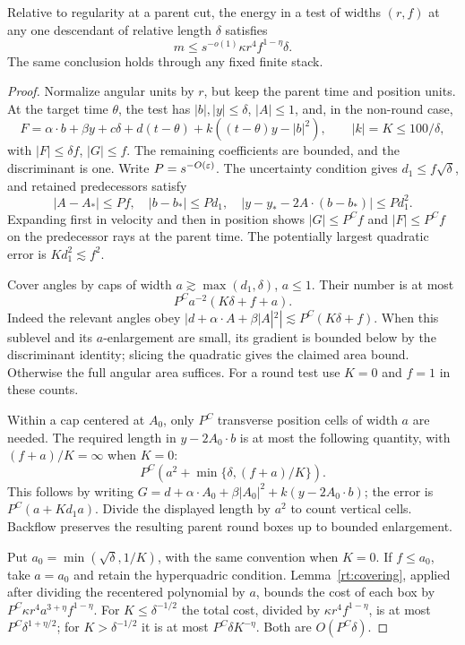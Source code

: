 \begin{lemma}\label{rt:single}
Relative to regularity at a parent cut, the energy in a test of widths
$(r,f)$ at any one descendant of relative length $\delta$ satisfies
\begin{equation}
 m\le s^{-o(1)}\kappa r^4 f^{1-\eta}\delta.
 \tag{single}\label{eq:single}
\end{equation}
The same conclusion holds through any fixed finite stack.
\end{lemma}

\begin{proof}
Normalize angular units by $r$, but keep the parent time and position units.
At the target time $\theta$, the test has $|b|,|y|\le\delta$, $|A|\le1$,
and, in the non-round case,
\[
 F=\alpha\cdot b+\beta y+c\delta+d(t-\theta)
       +k((t-\theta)y-|b|^2),\qquad |k|=K\le100/\delta,
\]
with $|F|\le\delta f$, $|G|\le f$.  The remaining coefficients are
bounded, and the discriminant is one.  Write $P=s^{-O(\varepsilon)}$.
The uncertainty condition gives $d_1\le f\sqrt\delta$, and retained
predecessors satisfy
\[
 |A-A_*|\le Pf,\quad |b-b_*|\le Pd_1,\quad
 |y-y_*-2A\cdot(b-b_*)|\le Pd_1^2.
\]
Expanding first in velocity and then in position shows
$|G|\le P^Cf$ and $|F|\le P^Cf$ on the predecessor rays at the parent
time.  The potentially largest quadratic error is
$Kd_1^2\lesssim f^2$.

Cover angles by caps of width $a\gtrsim\max(d_1,\delta)$, $a\le1$.
Their number is at most
\[
 P^Ca^{-2}(K\delta+f+a).
\]
Indeed the relevant angles obey
$|d+\alpha\cdot A+\beta|A|^2|\lesssim P^C(K\delta+f)$.
When this sublevel and its $a$-enlargement are small, its gradient is
bounded below by the discriminant identity; slicing the quadratic gives
the claimed area bound.  Otherwise the full angular area suffices.
For a round test use $K=0$ and $f=1$ in these counts.

Within a cap centered at $A_0$, only $P^C$ transverse position cells of
width $a$ are needed.  The required length in $y-2A_0\cdot b$ is at most
the following quantity, with $(f+a)/K=\infty$ when $K=0$:
\[
 P^C\left(a^2+\min\{\delta,(f+a)/K\}\right).
\]
This follows by writing
$G=d+\alpha\cdot A_0+\beta|A_0|^2+k(y-2A_0\cdot b)$; the error is
$P^C(a+Kd_1a)$.  Divide the displayed length by $a^2$ to count vertical
cells.  Backflow preserves the resulting parent round boxes up to
bounded enlargement.

Put $a_0=\min(\sqrt\delta,1/K)$, with the same convention when $K=0$.
If $f\le a_0$, take $a=a_0$ and retain the hyperquadric condition.
Lemma~\ref{rt:covering}, applied after dividing the recentered polynomial
by $a$, bounds the cost of each box by
$P^C\kappa r^4a^{3+\eta}f^{1-\eta}$.
For $K\le\delta^{-1/2}$ the total cost, divided by
$\kappa r^4f^{1-\eta}$, is at most
$P^C\delta^{1+\eta/2}$; for $K>\delta^{-1/2}$ it is at most
$P^C\delta K^{-\eta}$.  Both are $O(P^C\delta)$.


\end{proof}
